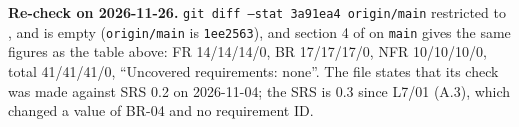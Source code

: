 \begin{sloppypar}
\textbf{Re-check on 2026-11-26.} \texttt{git diff --stat 3a91ea4 origin/main} restricted to ,  and  is empty (\texttt{origin/main} is \texttt{1ee2563}), and section 4 of  on \texttt{main} gives the same figures as the table above: FR 14/14/14/0, BR 17/17/17/0, NFR 10/10/10/0, total 41/41/41/0, ``Uncovered requirements: none''. The file states that its check was made against SRS 0.2 on 2026-11-04; the SRS is 0.3 since L7/01 (A.3), which changed a value of BR-04 and no requirement ID.
\end{sloppypar}

